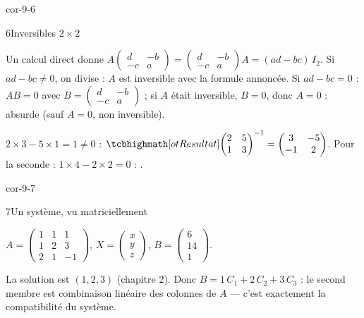 \begin{blocLivre}{cor-9-6}
\begin{corrige}{6}{Inversibles $2\times2$}
\begin{questions}
  \item Un calcul direct donne
    $A\begin{pmatrix}d&-b\\-c&a\end{pmatrix}
    =\begin{pmatrix}d&-b\\-c&a\end{pmatrix}A=(ad-bc)\,I_2$.
    Si $ad-bc\neq0$, on divise : $A$ est inversible avec la formule
    annoncée. Si $ad-bc=0$ : $AB=0$ avec
    $B=\begin{pmatrix}d&-b\\-c&a\end{pmatrix}$ ; si $A$ était inversible,
    $B=0$, donc $A=0$ : absurde (sauf $A=0$, non inversible).
  \item $2\times3-5\times1=1\neq0$ :
    $\res{\begin{pmatrix}2&5\\1&3\end{pmatrix}^{-1}
    =\begin{pmatrix}3&-5\\-1&2\end{pmatrix}}$.
    Pour la seconde : $1\times4-2\times2=0$ : .
\end{questions}
\end{corrige}
\end{blocLivre}

\begin{blocLivre}{cor-9-7}
\begin{corrige}{7}{Un système, vu matriciellement}
\begin{questions}
  \item $A=\begin{pmatrix}1&1&1\\1&2&3\\2&1&-1\end{pmatrix}$,
    $X=\begin{pmatrix}x\\y\\z\end{pmatrix}$,
    $B=\begin{pmatrix}6\\14\\1\end{pmatrix}$.
  \item La solution est $(1,2,3)$ (chapitre 2). Donc
    $B=1\,C_1+2\,C_2+3\,C_3$ : le second membre est combinaison linéaire
    des colonnes de $A$ — c'est exactement la compatibilité du système.
\end{questions}
\end{corrige}
\end{blocLivre}

